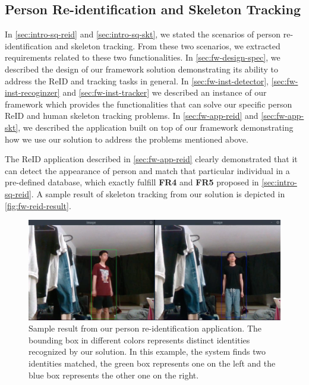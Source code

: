 \subsection{Person Re-identification and Skeleton Tracking}
\label{sec:Eval-framework-reid-skt}

In \autoref{sec:intro-sq-reid} and \autoref{sec:intro-sq-skt}, we stated the
scenarios of person re-identification and skeleton tracking. From these two
scenarios, we extracted requirements related to these two functionalities.
In \autoref{sec:fw-design-spec}, we described the design of our framework
solution demonstrating its ability to address the ReID and tracking tasks in general.
In \autoref{sec:fw-inst-detector}, \autoref{sec:fw-inst-recoginzer} and
\autoref{sec:fw-inst-tracker} we described an instance of our framework which
provides the functionalities that can solve our specific person ReID and human 
skeleton tracking problems. 
In \autoref{sec:fw-app-reid} and \autoref{sec:fw-app-skt}, we described the
application built on top of our framework demonstrating how we use our solution
to address the problems mentioned above.

The ReID application described in \autoref{sec:fw-app-reid} clearly
demonstrated that it can detect the appearance of person and match that
particular individual in a pre-defined database, which exactly fulfill
\textbf{FR4} and \textbf{FR5} proposed in \autoref{sec:intro-sq-reid}.
A sample result of skeleton tracking from our solution is depicted in 
\autoref{fig:fw-reid-result}.

\begin{figure}
    \begin{center}
        \includegraphics[width=\linewidth]{figures/reid_result.png}
    \end{center}
    \caption[Sample result from our person re-identification application]
    {Sample result from our person re-identification application. The 
        bounding box in different colors represents distinct identities recognized 
        by our solution. In this example, the system finds two identities 
        matched, the green box represents one on the left and the blue box 
        represents the other one on the right.}
    \label{fig:fw-reid-result}
\end{figure}

